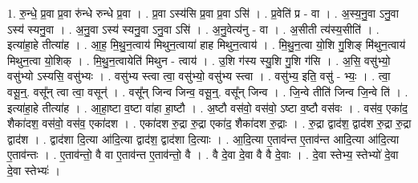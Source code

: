 \documentclass[17pt]{extarticle}
\begin{document}
1. रु॒न्धे॒ प्र॒वा प्र॒वा रु॑न्धे रुन्धे प्र॒वा । . प्र॒वा ऽस्य॑सि प्र॒वा प्र॒वा ऽसि॑ । . प्र॒वेति॑ प्र - वा । . अ॒स्य॒नु॒वा ऽनु॒वा ऽस्य॑ स्यनु॒वा । . अ॒नु॒वा ऽस्य॑ स्यनु॒वा ऽनु॒वा ऽसि॑ । . अ॒नु॒वेत्य॑नु - वा । . अ॒सीती त्य॑स्य॒सीति॑ । . इत्या॑हा॒हे तीत्या॑ह । . आ॒ह॒ मि॒थु॒न॒त्वाय॑ मिथुन॒त्वाया॑ हाह मिथुन॒त्वाय॑ । . मि॒थु॒न॒त्वा यो॒शि गु॒शिङ् मि॑थुन॒त्वाय॑ मिथुन॒त्वा यो॒शिक् । . मि॒थु॒न॒त्वायेति॑ मिथुन - त्वाय॑ । . उ॒शि ग॑स्य स्यु॒शि गु॒शि ग॑सि । . अ॒सि॒ वसु॑भ्यो॒ वसु॑भ्यो ऽस्यसि॒ वसु॑भ्यः । . वसु॑भ्य स्त्वा त्वा॒ वसु॑भ्यो॒ वसु॑भ्य स्त्वा । . वसु॑भ्य॒ इति॒ वसु॑ - भ्यः॒ । . त्वा॒ वसू॒न्॒. वसू᳚न् त्वा त्वा॒ वसून्॑ । . वसू᳚न् जिन्व जिन्व॒ वसू॒न्॒. वसू᳚न् जिन्व । . जि॒न्वे तीति॑ जिन्व जि॒न्वे ति॑ । . इत्या॑हा॒हे तीत्या॑ह । . आ॒हा॒ष्टा व॒ष्टा वा॑हा हा॒ष्टौ । . अ॒ष्टौ वस॑वो॒ वस॑वो॒ ऽष्टा व॒ष्टौ वस॑वः । . वस॑व॒ एका॑द॒ शैका॑दश॒ वस॑वो॒ वस॑व॒ एका॑दश । . एका॑दश रु॒द्रा रु॒द्रा एका॑द॒ शैका॑दश रु॒द्राः । . रु॒द्रा द्वाद॑श॒ द्वाद॑श रु॒द्रा रु॒द्रा द्वाद॑श । . द्वाद॑शा दि॒त्या आ॑दि॒त्या द्वाद॑श॒ द्वाद॑शा दि॒त्याः । . आ॒दि॒त्या ए॒ताव॑न्त ए॒ताव॑न्त आदि॒त्या आ॑दि॒त्या ए॒ताव॑न्तः । . ए॒ताव॑न्तो॒ वै वा ए॒ताव॑न्त ए॒ताव॑न्तो॒ वै । . वै दे॒वा दे॒वा वै वै दे॒वाः । . दे॒वा स्तेभ्य॒ स्तेभ्यो॑ दे॒वा दे॒वा स्तेभ्यः॑ । \newline
\end{document}
